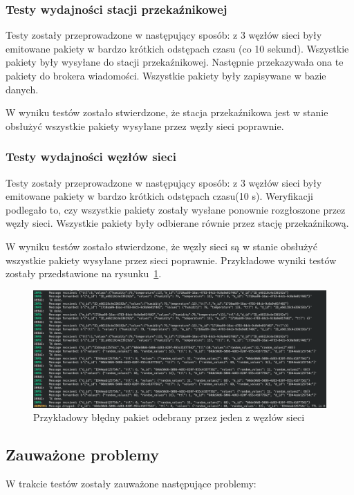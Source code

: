 \subsubsection{Testy wydajności stacji przekaźnikowej}
Testy zostały przeprowadzone w następujący sposób: z 3 węzłów sieci były emitowane pakiety w bardzo krótkich odstępach czasu (co 10 sekund). Wszystkie pakiety były wysyłane do stacji przekaźnikowej. Następnie przekazywała ona te pakiety do brokera wiadomości. Wszystkie pakiety były zapisywane w bazie danych.

W wyniku testów zostało stwierdzone, że stacja przekaźnikowa jest w stanie obsłużyć wszystkie pakiety wysyłane przez węzły sieci poprawnie.

\subsubsection{Testy wydajności węzłów sieci}
Testy zostały przeprowadzone w następujący sposób: z 3 węzłów sieci były emitowane pakiety w bardzo krótkich odstępach czasu(10 s). Weryfikacji podlegało to, czy wszystkie pakiety zostały wysłane ponownie rozgłoszone przez węzły sieci. Wszystkie pakiety były odbierane równie przez stację przekaźnikową.

W wyniku testów zostało stwierdzone, że węzły sieci są w stanie obsłużyć wszystkie pakiety wysyłane przez sieci poprawnie. Przykładowe wyniki testów zostały przedstawione na rysunku~\ref{rys:odbijanie-pakietu}.

\begin{figure}[b!]
    \begin{center}
        \includegraphics[width=13cm]{pic/odbijanie-pakietu.png}
    \end{center}
    \caption{Przykładowy błędny pakiet odebrany przez jeden z węzłów sieci}\label{rys:odbijanie-pakietu}
\end{figure}

\subsection{Zauważone problemy}
W trakcie testów zostały zauważone następujące problemy:
